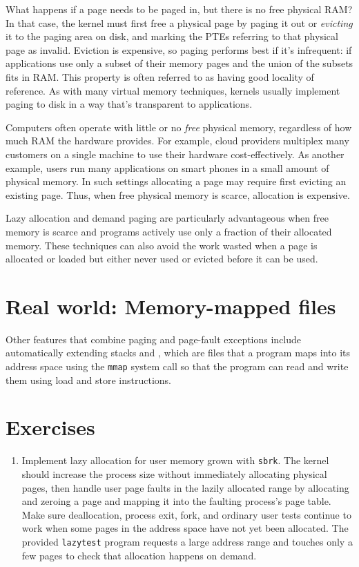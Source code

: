 What happens if a page needs to be paged in, but there is no free
physical RAM? In that case, the kernel must first free a physical page
by paging it out or {\it evicting} it to the paging area on disk, and
marking the PTEs referring to that physical page as invalid. Eviction
is expensive, so paging performs best if it's infrequent: if
applications use only a subset of their memory pages and the union of
the subsets fits in RAM. This property is often referred to as having
good locality of reference. As with many virtual memory techniques,
kernels usually implement paging to disk in a way that's transparent
to applications.

Computers often operate with little or no {\it free} physical memory,
regardless of how much RAM the hardware provides. For example, cloud
providers multiplex many customers on a single machine to use their
hardware cost-effectively. As another example, users run many
applications on smart phones in a small amount of physical memory. In
such settings allocating a page may require first evicting an existing
page. Thus, when free physical memory is scarce, allocation is
expensive.

Lazy allocation and demand paging are particularly advantageous when
free memory is scarce and programs actively use only a fraction of
their allocated memory. These techniques can also avoid the work
wasted when a page is allocated or loaded but either never used or
evicted before it can be used.

\section{Real world: Memory-mapped files}

Other features that combine paging and page-fault exceptions include
automatically extending stacks and ,
which are files that a program maps into its address space using
the \texttt{mmap} system call so that the program can read and write
them using load and store instructions.

\section{Exercises}

\begin{enumerate}

\item Implement lazy allocation for user memory grown with
\lstinline{sbrk}. The kernel should increase the process size without
immediately allocating physical pages, then handle user page faults in
the lazily allocated range by allocating and zeroing a page and mapping
it into the faulting process's page table. Make sure deallocation,
process exit, fork, and ordinary user tests continue to work when some
pages in the address space have not yet been allocated. The provided
\texttt{lazytest} program requests a large address range and touches only
a few pages to check that allocation happens on demand.

\end{enumerate}
